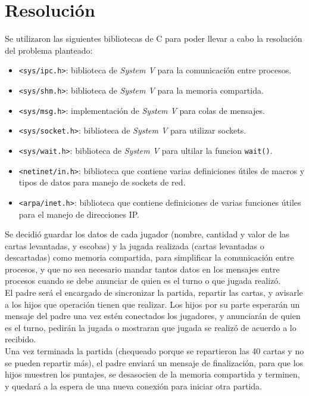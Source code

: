 \section{Resolución}

Se utilizaron las siguientes bibliotecas de C para poder llevar a cabo la resolución del problema planteado:\\

\begin{itemize}
    \item \texttt{<sys/ipc.h>}: biblioteca de \textit{System V} para la comunicación entre procesos.
    \item \texttt{<sys/shm.h>}: biblioteca de \textit{System V} para la memoria compartida.
    \item \texttt{<sys/msg.h>}: implementación de \textit{System V} para colas de mensajes.
    \item \texttt{<sys/socket.h>}: biblioteca de \textit{System V} para utilizar sockets.
    \item \texttt{<sys/wait.h>}: biblioteca de \textit{System V} para ultilar la funcion \texttt{wait()}.
    \item \texttt{<netinet/in.h>}: biblioteca que contiene varias definiciones útiles de macros y tipos de datos para manejo de sockets de red.
    \item \texttt{<arpa/inet.h>}: biblioteca que contiene definiciones de varias funciones útiles para el manejo de direcciones IP.\\
    
\end{itemize}

Se decidió guardar los datos de cada jugador (nombre, cantidad y valor de las cartas levantadas, y escobas) y la jugada realizada (cartas levantadas o descartadas) como memoria compartida, para simplificar la comunicación entre procesos, y que no sea necesario mandar tantos datos en los mensajes entre procesos cuando se debe anunciar de quien es el turno o que jugada realizó.\\

El padre será el encargado de sincronizar la partida, repartir las cartas, y avisarle a los hijos que operación tienen que realizar. Los hijos por su parte esperarán un mensaje del padre una vez estén conectados los jugadores, y anunciarán de quien es el turno, pedirán la jugada o mostraran que jugada se realizó de acuerdo a lo recibido.\\

Una vez terminada la partida (chequeado porque se repartieron las 40 cartas y no se pueden repartir más), el padre enviará un mensaje de finalización, para que los hijos muestren los puntajes, se desasocien de la memoria compartida y terminen, y quedará a la espera de una nueva conexión para iniciar otra partida.\\

